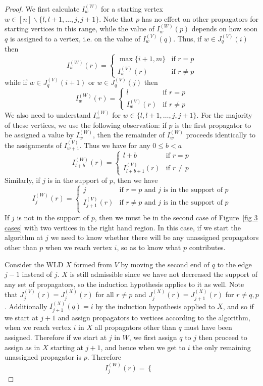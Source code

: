 \documentclass[11pt]{article}
\theoremstyle{remark}
\theoremstyle{definition}
\begin{document}
\begin{proof}
We first calculate $I^{(W)}_w$ for a starting vertex ${w \in [n]\backslash \{l, l+1, \ldots,j,j+1\}}$. Note that $p$ has no effect on other propagators for starting vertices in this range, while the value of $I^{(W)}_w(p)$ depends on how soon $q$ is assigned to a vertex, i.e. on the value of $I^{(V)}_w(q)$. Thus, if $w\in J_q^{(V)}(i)$ then
    \[
    I_w^{(W)}(r) =  \begin{cases}
        \max\{i+1, m\} & \text{if } r=p \\
        I_{w}^{(V)}(r) & \text{if } r\neq p
      \end{cases} 
    \]
    while if $w\in J_q^{(V)}(i+1)$ or $w\in J_q^{(V)}(j)$ then
    \[
    I_w^{(W)}(r) =  \begin{cases}
        l & \text{if } r=p \\
        I_{w}^{(V)}(r) & \text{if } r\neq p
      \end{cases} 
      \]
We also need to understand $I^{(W)}_w$ for $w \in \{l,l+1,\ldots,j,j+1\}$. For the majority of these vertices, we use the following observation: if $p$ is the first propagator to be assigned a value by $I_w^{(W)}$, then the remainder of $I_w^{(W)}$ proceeds identically to the assignments of $I^{(V)}_{w+1}$.  Thus we have for any $0\leq b <a$
    \[
    I_{l+b}^{(W)}(r) = \begin{cases}
      l+b & \text{if } r=p\\
      I_{l+b+1}^{(V)}(r) & \text{if } r\neq p
    \end{cases}
    \]
Similarly, if $j$ is in the support of $p$, then we have
     \[
       I_j^{(W)}(r) = \begin{cases}
         j & \text{if $r=p$ and $j$ is in the support of $p$}\\
         I_{j+1}^{(V)}(r) & \text{if $r\neq p$ and $j$ is in the support of $p$}\\
       \end{cases}
       \]
If $j$ is not in the support of $p$, then we must be in the second case of Figure~\ref{fig 3 cases} with two vertices in the right hand region.  In this case, if we start the algorithm at $j$ we need to know whether there will be any unassigned propagators other than $p$ when we reach vertex $i$, so as to know what $p$ contributes.

Consider the WLD $X$ formed from $V$ by moving the second end of $q$ to the edge $j-1$ instead of $j$.  $X$ is still admissible since we have not decreased the support of any set of propagators, so the induction hypothesis applies to it as well.  Note that $J_{j}^{(V)}(r) = J_{j}^{(X)}(r)$ for all $r\neq p$ and $J_{j}^{(X)}(r) = J_{j+1}^{(X)}(r)$ for $r\neq q,p$.  Additionally $I_{j+1}^{(X)}(q) = i$ by the induction hypothesis applied to $X$, and so if we start at $j+1$ and assign propagators to vertices according to the algorithm, when we reach vertex $i$ in $X$ all propagators other than $q$ must have been assigned.  Therefore if we start at $j$ in $W$, we first assign $q$ to $j$ then proceed to assign as in $X$ starting at $j+1$, and hence when we get to $i$ the only remaining unassigned propagator is $p$. Therefore
       \[
       I_j^{(W)}(r) = \begin{cases}


\end{cases}\]
\end{proof}
\end{document}
